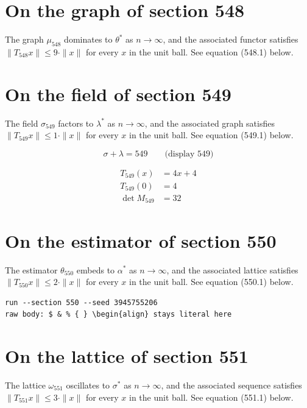\documentclass{article}
\begin{document}
\section{On the graph of section 548}
The graph $\mu_{548}$ dominates to $\theta^{*}$ as $n \to \infty$,
and the associated functor satisfies $\|T_{548} x\| \leq 9 \cdot \|x\|$
for every $x$ in the unit ball. See equation (548.1) below.

\section{On the field of section 549}
The field $\sigma_{549}$ factors to $\lambda^{*}$ as $n \to \infty$,
and the associated graph satisfies $\|T_{549} x\| \leq 1 \cdot \|x\|$
for every $x$ in the unit ball. See equation (549.1) below.

$$
\sigma + \lambda = 549 \qquad \text{(display 549)}
$$

\begin{align}
T_{549}(x) &= 4 x + 4 \\
T_{549}(0) &= 4 \\
\det M_{549} &= 32
\end{align}

\section{On the estimator of section 550}
The estimator $\theta_{550}$ embeds to $\alpha^{*}$ as $n \to \infty$,
and the associated lattice satisfies $\|T_{550} x\| \leq 2 \cdot \|x\|$
for every $x$ in the unit ball. See equation (550.1) below.

\begin{verbatim}
run --section 550 --seed 3945755206
raw body: $ & % { } \begin{align} stays literal here
\end{verbatim}

\section{On the lattice of section 551}
The lattice $\omega_{551}$ oscillates to $\sigma^{*}$ as $n \to \infty$,
and the associated sequence satisfies $\|T_{551} x\| \leq 3 \cdot \|x\|$
for every $x$ in the unit ball. See equation (551.1) below.
\end{document}
